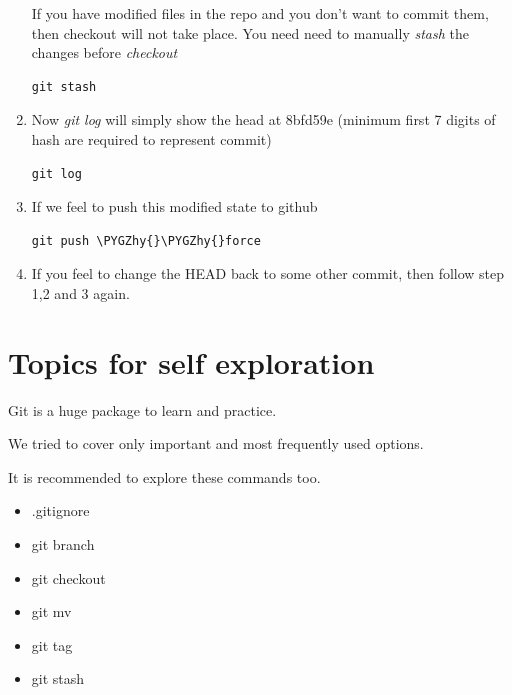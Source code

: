 \documentclass[letterpaper,10pt,english]{sphinxmanual}
\def\PYGZhy{\char`\-}
\begin{document}
\begin{enumerate}
If you have modified files in the repo and you don't want to commit them, then checkout will not
take place. You need need to manually \emph{stash} the changes before \emph{checkout}

\begin{Verbatim}[commandchars=\\\{\}]
git stash
\end{Verbatim}

\item {} 
Now \emph{git log} will simply show the head at 8bfd59e (minimum first 7 digits
of hash are required to represent commit)

\begin{Verbatim}[commandchars=\\\{\}]
git log
\end{Verbatim}

\item {} 
If we feel to push this modified state to github

\begin{Verbatim}[commandchars=\\\{\}]
git push \PYGZhy{}\PYGZhy{}force
\end{Verbatim}

\item {} 
If you feel to change the HEAD back to some other commit, then follow step 1,2 and 3 again.

\end{enumerate}


\chapter{Topics for self exploration}
\label{version-control:topics-for-self-exploration}
Git is a huge package to learn and practice.

We tried to cover only important and most frequently used options.

It is recommended to explore these commands too.
\begin{itemize}
\item {} 
.gitignore

\item {} 
git branch

\item {} 
git checkout

\item {} 
git mv

\item {} 
git tag

\item {} 
git stash

\end{itemize}
\end{document}
